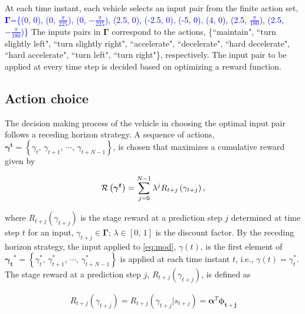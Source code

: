 \documentclass[10pt,journal]{IEEEtran}
\begin{document}
	At each time instant, each vehicle selects an input pair from the finite action set, \textcolor{blue}{$\boldsymbol{\Gamma}$=\{(0, 0), (0, $\frac{\pi}{225}$), (0, $-\frac{\pi}{225}$), (2.5, 0), (-2.5, 0), (-5, 0), (4, 0), (2.5, $\frac{\pi}{180}$), (2.5, $-\frac{\pi}{180}$)\} } %
	The inputs pairs in $ \boldsymbol{\Gamma}$ correspond to the actions, \{``maintain", ``turn slightly left", ``turn slightly right", ``accelerate", ``decelerate", ``hard decelerate", ``hard accelerate", ``turn left", ``turn right"\}, respectively. The input pair to be applied at every time step is decided based on optimizing a reward function.
	
	
	\subsection{Action choice}
	
	The decision making process of the vehicle in choosing the optimal input pair follows a receding horizon strategy. A sequence of actions, $\boldsymbol{\gamma^{t}} = \left\{\gamma_{t},\,\gamma_{t+1},\,\cdots,\,\gamma_{t+N-1}\right\}$, is chosen that maximizes a cumulative reward given by
	
	\begin{align}
	\mathcal{R}\left(\boldsymbol{\gamma^{t}}\right) = \sum_{j=0}^{N-1} \lambda^{\textcolor{blue}{j}} R_{t+j}\left(\gamma_{t+j}\right),
	\label{eq:cum_reward}
	\end{align}
	
	\noindent where $R_{t+j}\left(\gamma_{t+j}\right)$ is the stage reward at a prediction step $j$ determined at time step $t$ for an input, $\gamma_{t+j} \in  \boldsymbol{\Gamma}$; $\lambda \in \left[0,\,1\right]$ is the discount factor. By the receding horizon strategy, the input applied to \eqref{eq:mod}, $\gamma\left(t\right)$, is the first element of $\boldsymbol{\gamma_{t}}^* = \left\{\gamma_{t}^*,\,\gamma_{t+1}^*,\,\cdots,\,\gamma_{t+N-1}^*\right\}$ is applied at each time instant $t$, i.e.,  $\gamma\left(t\right) = \gamma_{t}^*$. The stage reward at a prediction step $j$, $R_{t+j}\left(\gamma_{t+j}\right)$, is defined as
	
	\begin{align}
	R_{t+j}\left(\gamma_{t+j}\right) = R_{t+j}\left(\gamma_{t+j}| s_{t+j}\right) = \boldsymbol{{\alpha}}^T \boldsymbol{\phi_{t+j}}
	\end{align}
	
\end{document}
